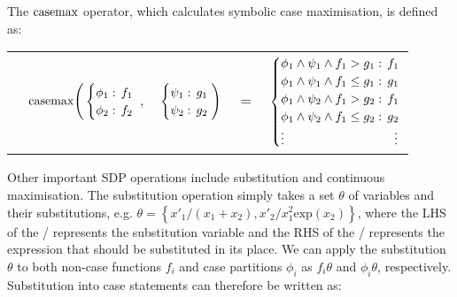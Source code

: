 The $\mathrm{casemax}$ operator, which calculates symbolic case maximisation,
is defined as:
{\small 
\begin{center}
  \begin{tabular}{r c c c l}
  &
  \hspace{-7mm} $\mathrm{casemax} \Bigg(
    \begin{cases}
        \phi_1: \hspace{-1mm} & \hspace{-1mm} f_1 \\ 
        \phi_2: \hspace{-1mm} & \hspace{-1mm} f_2 \\ 
    \end{cases}$
  $,$
  &
  \hspace{-4mm}
    $\begin{cases}
        \psi_1: \hspace{-1mm} & \hspace{-1mm} g_1 \\ 
        \psi_2: \hspace{-1mm} & \hspace{-1mm} g_2 \\ 
    \end{cases} \Bigg)$
  &
  \hspace{-4mm} 
  $ = $
  &
  \hspace{-4mm}
    $\begin{cases}
      \phi_1 \wedge \psi_1 \wedge f_1 > g_1    : & \hspace{-2mm} f_1 \\ 
      \phi_1 \wedge \psi_1 \wedge f_1 \leq g_1 : & \hspace{-2mm} g_1 \\ 
      \phi_1 \wedge \psi_2 \wedge f_1 > g_2    : & \hspace{-2mm} f_1 \\ 
      \phi_1 \wedge \psi_2 \wedge f_1 \leq g_2 : & \hspace{-2mm} g_2 \\ 
      \vdots & \vdots
    \end{cases}$
  \end{tabular}
\end{center}
}%

Other important SDP operations include substitution and continuous maximisation. 
The substitution operation simply takes a set $\theta$ of variables and their
substitutions, e.g. $\theta = \left\{ x'_1/(x_1 + x_2), x'_2/x^2_{1} \text{exp}(x_2) \right\}$,
where the LHS of the / represents the substitution variable and the 
RHS of the / represents the expression that should be substituted in its place.
We can apply the substitution $\theta$ to both non-case functions $f_i$
and case partitions $\phi_i$ as $f_i\theta$ and $\phi_i\theta$, respectively.
Substitution into case statements can therefore be written as:

